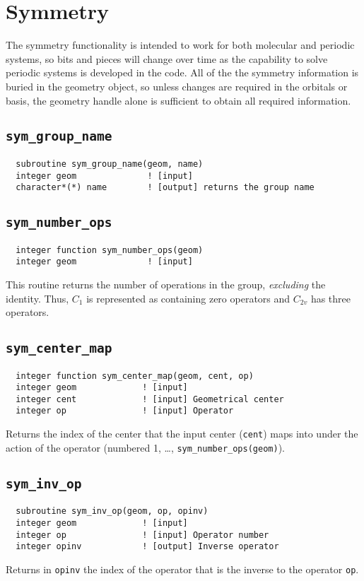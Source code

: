 \section{Symmetry}
\label{sec:sym}

The symmetry functionality is intended to work for both molecular and
periodic systems, so bits and pieces will change over time as the
capability to solve periodic systems is developed in the code.
All of the the symmetry information is buried in the geometry
object, so unless changes are required in the orbitals or basis, the
geometry handle alone is sufficient to obtain all required information.


\subsection{{\tt sym\_group\_name}}
\begin{verbatim}
  subroutine sym_group_name(geom, name)
  integer geom              ! [input]
  character*(*) name        ! [output] returns the group name
\end{verbatim}

\subsection{{\tt sym\_number\_ops}}
\begin{verbatim}
  integer function sym_number_ops(geom)
  integer geom              ! [input]
\end{verbatim}
This routine  returns the number of operations in the group, {\em excluding} the
identity.  Thus, $C_1$ is represented as containing zero operators and
$C_{2v}$ has three operators.

\subsection{{\tt sym\_center\_map}}
\begin{verbatim}
  integer function sym_center_map(geom, cent, op)
  integer geom             ! [input]
  integer cent             ! [input] Geometrical center
  integer op               ! [input] Operator
\end{verbatim}
Returns the index of the center that the input center
(\verb+cent+) maps into under the action of the operator
(numbered 1, \ldots, \verb+sym_number_ops(geom)+).

\subsection{{\tt sym\_inv\_op}}
\label{sec:syminvop}
\begin{verbatim}
  subroutine sym_inv_op(geom, op, opinv)
  integer geom             ! [input]
  integer op               ! [input] Operator number
  integer opinv            ! [output] Inverse operator
\end{verbatim}
Returns in \verb+opinv+ the index of the operator that is
the inverse to the operator \verb+op+.

